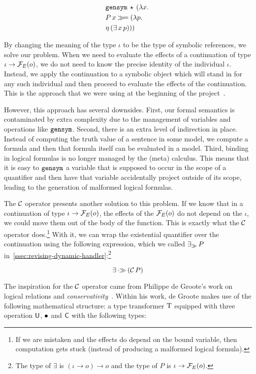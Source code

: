 \begin{align*}
  &\mathtt{gensym}\,\star\,(\lambda x.\,  \\
  &P\,x \mathbin{\gg\!=} (\lambda p.\,  \\
  &\eta\,(\exists\,x\,p)))
\end{align*}

By changing the meaning of the type $\iota$ to be the type of symbolic
references, we solve our problem. When we need to evaluate the effects of a
continuation of type $\iota \to \mathcal{F}_E(o)$, we do not need to know the
precise identity of the individual $\iota$. Instead, we apply the
continuation to a symbolic object which will stand in for any such
individual and then proceed to evaluate the effects of the
continuation. This is the approach that we were using at the beginning of
the project~\cite{marsik2014algebraic}.

However, this approach has several downsides. First, our formal semantics
is contaminated by extra complexity due to the management of variables and
operations like $\mathtt{gensym}$. Second, there is an extra level of
indirection in place. Instead of computing the truth value of a sentence in
some model, we compute a formula and then that formula itself can be
evaluated in a model. Third, binding in logical formulas is no longer
managed by the (meta) calculus. This means that it is easy to $\mathtt{gensym}$
a variable that is supposed to occur in the scope of a quantifier and then
have that variable accidentally project outside of its scope, leading to
the generation of malformed logical formulas.

The $\mathcal{C}$ operator presents another solution to this problem. If we know
that in a continuation of type $\iota \to \mathcal{F}_E(o)$, the effects of the
$\mathcal{F}_E(o)$ do not depend on the $\iota$, we could move them out of the body
of the function. This is exactly what the $\mathcal{C}$ operator does.\footnote{If
  we are mistaken and the effects do depend on the bound variable, then
  computation gets stuck (instead of producing a malformed logical
  formula).} With it, we can wrap the existential quantifier over the
continuation using the following expression, which we called $\mathop{\exists_\gg} P$
in~\ref{ssec:revising-dynamic-handler}:\footnote{The type of $\exists$ is
  $(\iota \to o) \to o$ and the type of $P$ is $\iota \to \mathcal{F}_E(o)$.}

$$
  \exists \mathbin{\cdot\!\!\gg} (\mathcal{C}\,P)
$$

The inspiration for the $\mathcal{C}$ operator came from Philippe de Groote's work
on logical relations and
\emph{conservativity}~\cite{degroote2015conservativity}. Within his work,
de Groote makes use of the following mathematical structure: a type
transformer $\text{T}$ equipped with three operation $\mathsf{U}$, $\mathbin{\bullet}$ and $\mathsf{C}$
with the following types:

